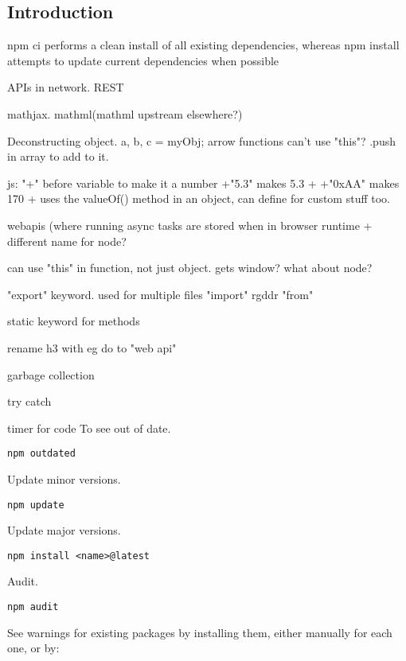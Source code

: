 
\subsection{Introduction}

npm ci performs a clean install of all existing dependencies, whereas npm install attempts to update current dependencies when possible



APIs in network. REST

mathjax. mathml(mathml upstream elsewhere?)

Deconstructing object. {a, b, c} = myObj;
arrow functions can't use "this"?
.push in array to add to it.

js:
"+" before variable to make it a number
+"5.3" makes 5.3
+ +"0xAA" makes 170
+ uses the valueOf() method in an object, can define for custom stuff too.

webapis (where running async tasks are stored when in browser runtime
+ different name for node?

can use "this" in function, not just object. gets window? what about node?

"export" keyword. used for multiple files
"import" rgddr "from"

static keyword for methods

rename h3 with eg do to "web api"

garbage collection

try catch

timer for code
To see out of date.

\begin{verbatim}
npm outdated
\end{verbatim}

Update minor versions.

\begin{verbatim}
npm update
\end{verbatim}

Update major versions.

\begin{verbatim}
npm install <name>@latest
\end{verbatim}

Audit.

\begin{verbatim}
npm audit
\end{verbatim}

See warnings for existing packages by installing them, either manually for each one, or by:

